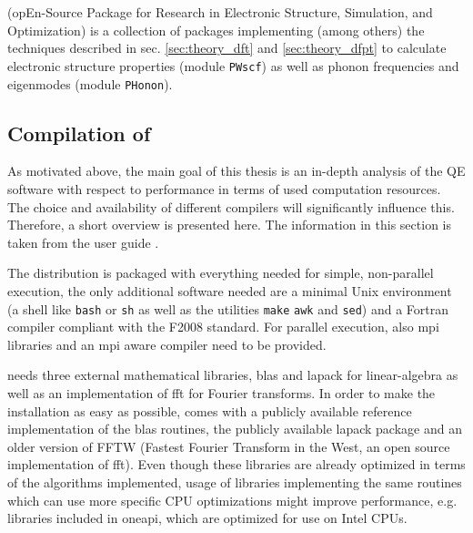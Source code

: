 \documentclass[main.tex]{subfiles}
\begin{document}
\section{\QE}\label{sec:qe}

\QE (opEn-Source Package for Research in Electronic Structure, Simulation, and Optimization) \cite{giannozzi_quantum_2009,giannozzi_advanced_2017} is a collection of packages implementing (among others) the techniques described in sec. \ref{sec:theory_dft} and \ref{sec:theory_dfpt} to calculate electronic structure properties (module \texttt{PWscf}) as well as phonon frequencies and eigenmodes (module \texttt{PHonon}).

\subsection{Compilation of \QE}\label{sub:qe_compilation}

As motivated above, the main goal of this thesis is an in-depth analysis of the QE software with respect to performance in terms of used computation resources.
The choice and availability of different compilers will significantly influence this.
Therefore, a short overview is presented here.
The information in this section is taken from the  user guide \cite{noauthor_quantum_nodate}.

The \QE distribution is packaged with everything needed for simple, non-parallel execution, the only additional software needed are a minimal Unix environment (a shell like \texttt{bash} or \texttt{sh} as well as the utilities \texttt{make} \texttt{awk} and \texttt{sed}) and a Fortran compiler compliant with the F2008 standard.
For parallel execution, also \gls{mpi} libraries and an \gls{mpi} aware compiler need to be provided.

\QE needs three external mathematical libraries, \gls{blas} and \gls{lapack} for linear-algebra as well as an implementation of \gls{fft} for Fourier transforms.
In order to make the installation as easy as possible, \QE comes with a publicly available reference implementation of the \gls{blas} routines, the publicly available \gls{lapack} package and an older version of FFTW (Fastest Fourier Transform in the West, an open source implementation of \gls{fft}).
Even though these libraries are already optimized in terms of the algorithms implemented, usage of libraries implementing the same routines which can use more specific CPU optimizations might improve performance, e.g. libraries included in \gls{oneapi}, which are optimized for use on Intel CPUs.
\end{document}
